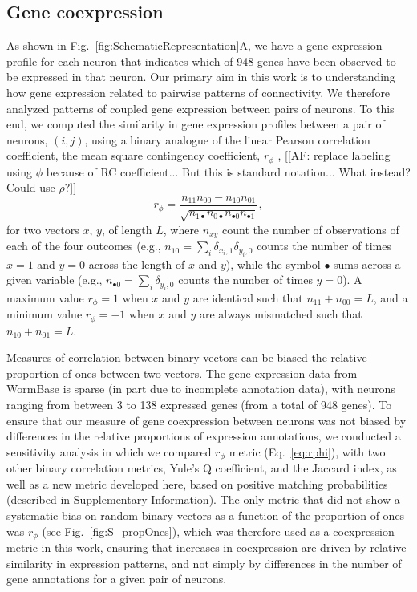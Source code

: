 \documentclass[10pt,letterpaper]{article}
\begin{document}
\subsection*{Gene coexpression}
As shown in Fig.~\ref{fig:SchematicRepresentation}A, we have a gene expression profile for each neuron that indicates which of 948 genes have been observed to be expressed in that neuron.
Our primary aim in this work is to understanding how gene expression related to pairwise patterns of connectivity.
We therefore analyzed patterns of coupled gene expression between pairs of neurons.
To this end, we computed the similarity in gene expression profiles between a pair of neurons, $(i,j)$, using a binary analogue of the linear Pearson correlation coefficient, the mean square contingency coefficient, $r_\phi$ \cite{Warrens2008}, [[AF: replace labeling using $\phi$ because of RC coefficient... But this is standard notation... What instead? Could use $\rho$?]]
\begin{equation} \label{eq:rphi}
    r_\phi = \frac{n_{11}n_{00} - n_{10}n_{01}}{\sqrt{n_{1\bullet}n_{0\bullet}n_{\bullet 0}n_{\bullet 1}}},
\end{equation}
for two vectors $x$, $y$, of length $L$, where $n_{xy}$ count the number of observations of each of the four outcomes (e.g., $n_{10} = \sum_i \delta_{x_i,1}\delta_{y_i,0}$ counts the number of times $x=1$ and $y=0$ across the length of $x$ and $y$), while the symbol $\bullet$ sums across a given variable (e.g., $n_{\bullet 0} = \sum_i \delta_{y_i,0}$ counts the number of times $y = 0$).
A maximum value $r_\phi = 1$ when $x$ and $y$ are identical such that $n_{11} + n_{00} = L$, and a minimum value $r_\phi = -1$ when $x$ and $y$ are always mismatched such that $n_{10} + n_{01} = L$.

Measures of correlation between binary vectors can be biased the relative proportion of ones between two vectors.
The gene expression data from WormBase is sparse (in part due to incomplete annotation data), with neurons ranging from between 3 to 138 expressed genes (from a total of 948 genes).
To ensure that our measure of gene coexpression between neurons was not biased by differences in the relative proportions of expression annotations, we conducted a sensitivity analysis in which we compared $r_\phi$ metric (Eq.~\ref{eq:rphi}), with two other binary correlation metrics, Yule's Q coefficient, and the Jaccard index, as well as a new metric developed here, based on positive matching probabilities (described in Supplementary Information).
The only metric that did not show a systematic bias on random binary vectors as a function of the proportion of ones was $r_\phi$ (see Fig.~\ref{fig:S_propOnes}), which was therefore used as a coexpression metric in this work, ensuring that increases in coexpression are driven by relative similarity in expression patterns, and not simply by differences in the number of gene annotations for a given pair of neurons.
\end{document}
